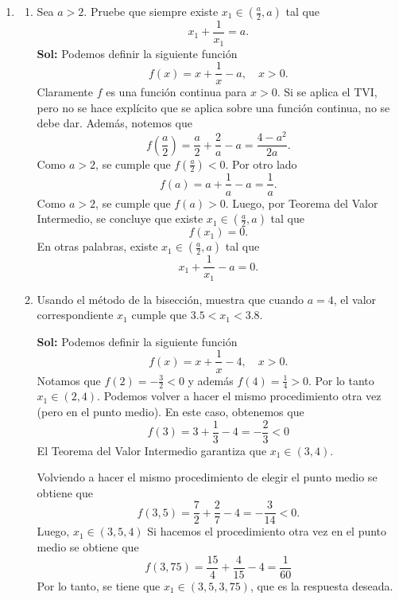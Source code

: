 \documentclass[letterpaper,12pt]{article}
\theoremstyle{plain}
\theoremstyle{definition}
\newcommand{\1}{\mathbbm{1}}
\begin{document}
\begin{enumerate}[label=\textbf{P\arabic*.}, itemsep=0cm]
\begin{enumerate}
    \color{blue}
    \textbf{Sol:} Para determinar las asíntotas verticales, analizamos el dominio de la función: La raíz cuadrada en el denominador impone la condición:
\[
x^2 - 1 > 0 \quad \Rightarrow \quad x < -1 \quad \text{o} \quad x > 1.
\]
Entonces,
\[
\text{Dom}(g) = (-\infty, -1) \cup (1, \infty)
\]
De donde, los candidatos a ser asíntotas verticales son \(x = -1\) y \(x = 1\).
Evaluamos los límites laterales:
\[
\lim_{x \to 1^+} \frac{4x^2}{\sqrt{x^2 - 1}} = +\infty, \qquad 
\lim_{x \to -1^-} \frac{4x^2}{\sqrt{x^2 - 1}} = +\infty
\]
Por tanto, \(x = -1\) y \(x = 1\) son asíntotas verticales.
    \color{black}
\end{enumerate}
\item \begin{enumerate}
    \item Sea \( a > 2 \). Pruebe que siempre existe \( x_1 \in \left( \frac{a}{2}, a \right) \) tal que
\[
x_1 + \frac{1}{x_1} = a.
\]
\color{blue}
    \textbf{Sol:} Podemos definir la siguiente función
\[
f(x) = x + \frac{1}{x} - a, \quad x > 0.
\]
Claramente \( f \) es una función continua para \( x > 0 \). Si se aplica el TVI, pero no se hace explícito que se aplica sobre una función continua, no se debe dar. Además, notemos que
\[
f\left( \frac{a}{2} \right) = \frac{a}{2} + \frac{2}{a} - a = \frac{4 - a^2}{2a}.
\]
Como \( a > 2 \), se cumple que \( f\left( \frac{a}{2} \right) < 0 \).
Por otro lado
\[
f(a) = a + \frac{1}{a} - a = \frac{1}{a}.
\]
Como \( a > 2 \), se cumple que \( f(a) > 0 \).
Luego, por Teorema del Valor Intermedio, se concluye que existe \( x_1 \in \left( \frac{a}{2}, a \right) \) tal que
\[
f(x_1) = 0.
\]
En otras palabras, existe \( x_1 \in \left( \frac{a}{2}, a \right) \) tal que
\[
x_1 + \frac{1}{x_1} - a = 0.
\]

    \color{black}
\item Usando el método de la bisección, muestra que cuando \( a = 4 \), el valor correspondiente \( x_1 \) cumple que \( 3.5 < x_1 < 3.8 \).

\color{blue}
    \textbf{Sol:} Podemos definir la siguiente función
\[
f(x) = x + \frac{1}{x} - 4, \quad x > 0.
\]
Notamos que \( f(2) = -\frac{3}{2} < 0 \) y además \( f(4) = \frac{1}{4} > 0 \). Por lo tanto \( x_1 \in (2, 4) \).
Podemos volver a hacer el mismo procedimiento otra vez (pero en el punto medio). En este caso, obtenemos que
\[
f(3) = 3 + \frac{1}{3} - 4 = -\frac{2}{3} < 0
\]
El Teorema del Valor Intermedio garantiza que \( x_1 \in (3, 4) \).

Volviendo a hacer el mismo procedimiento de elegir el punto medio se obtiene que
\[
f(3{,}5) = \frac{7}{2} + \frac{2}{7} - 4 = -\frac{3}{14} < 0.
\]
Luego, \( x_1 \in (3{,}5, 4) \)
Si hacemos el procedimiento otra vez en el punto medio se obtiene que
\[
f(3{,}75) = \frac{15}{4} + \frac{4}{15} - 4 = \frac{1}{60}
\]
Por lo tanto, se tiene que \( x_1 \in (3{,}5, 3{,}75) \),  
que es la respuesta deseada.


\end{enumerate}
\end{enumerate}
\end{document}
